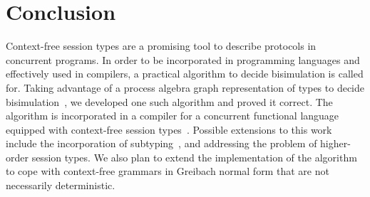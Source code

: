 \section{Conclusion}
\label{sec:conclusion}

Context-free session types are a promising tool to describe protocols
in concurrent programs. In order to be incorporated in programming
languages and effectively used in compilers, a practical algorithm to
decide bisimulation is called for.
%
Taking advantage of a process algebra graph representation of types to
decide
bisimulation~\cite{DBLP:journals/tcs/HirshfeldJM96,DBLP:conf/concur/HirshfeldM94},
we developed one such algorithm and proved it correct. The algorithm
is incorporated in a compiler for a concurrent functional language
equipped with context-free session
types~\cite{almeida.etal_freest-functional-language}.
%
Possible extensions to this work include the incorporation of
subtyping~\cite{DBLP:journals/acta/GayH05}, and addressing the problem
of higher-order session types. 
We also plan to extend the implementation of the algorithm to cope
with context-free grammars in Greibach normal form that are not 
necessarily deterministic.

\vspace*{1cm}


